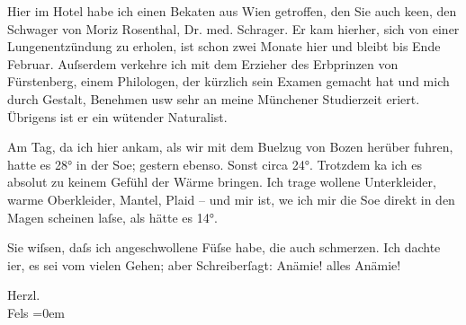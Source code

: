 \pstart
           Hier im Hotel habe ich einen Beka{\geminationn}ten aus Wien getroffen, den Sie auch ke{\geminationn}en, den Schwager von Moriz Rosenthal, Dr. med. Schrager.
               Er kam hierher, sich von einer Lungenentzündung zu erholen, ist schon zwei Monate
               hier und bleibt bis Ende Februar. Auſserdem verkehre ich mit dem Erzieher des Erbprinzen von Fürstenberg,
               einem Philologen, der kürzlich sein Examen gemacht hat und mich durch Gestalt,
               Benehmen usw sehr an meine Münchener
               Studierzeit eri{\geminationn}ert. Übrigens ist er ein wütender
               Naturalist.\pend
           
\pstart
           Am Tag, da ich hier ankam, als wir mit dem Bu{\geminationm}elzug von
                  Bozen herüber fuhren, hatte es 28° in der
                  So{\geminationn}e; gestern ebenso. Sonst circa 24°. {\pb}Trotzdem ka{\geminationn} ich es
               absolut zu keinem Gefühl der Wärme bringen. Ich trage wollene Unterkleider, warme
               Oberkleider, Mantel, Plaid – und mir ist, we{\geminationn} ich mir
               die So{\geminationn}e direkt in den Magen scheinen laſse, als hätte
               es 14°.\pend
           
\pstart
           Sie wiſsen, daſs ich angeschwollene Füſse habe, die auch schmerzen. Ich dachte i{\geminationm}er, es sei vom vielen Gehen; aber Schreiberſagt: Anämie! alles Anämie!\pend
           
\pstart
           Herzl. {\\[\baselineskip]}\spacefill\mbox{Fels}\pend
           \leftskip=0em{}\endnumbering{}  \newcommand{\dateiname}{L00177}\newcommand{\titel}{Friedrich M. Fels an Arthur Schnitzler, 1[7]. 2. 1893}\newcommand{\editorInnen}{Martin Anton Müller und Gerd-Hermann Susen}
